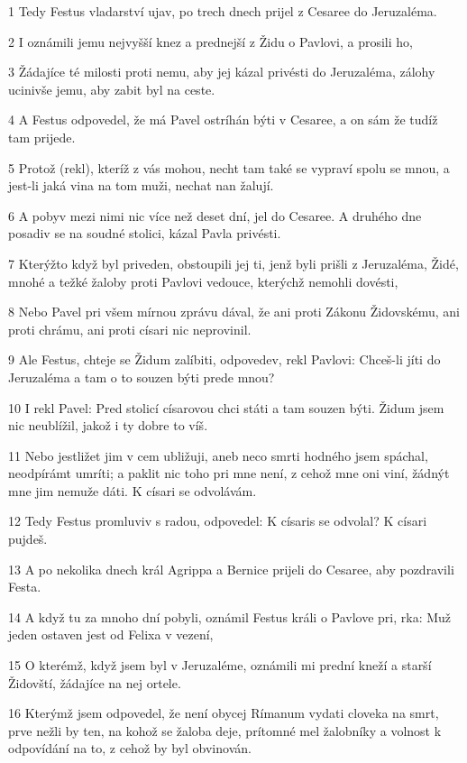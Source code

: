 \par 1 Tedy Festus vladarství ujav, po trech dnech prijel z Cesaree do Jeruzaléma.
\par 2 I oznámili jemu nejvyšší knez a prednejší z Židu o Pavlovi, a prosili ho,
\par 3 Žádajíce té milosti proti nemu, aby jej kázal privésti do Jeruzaléma, zálohy ucinivše jemu, aby zabit byl na ceste.
\par 4 A Festus odpovedel, že má Pavel ostríhán býti v Cesaree, a on sám že tudíž tam prijede.
\par 5 Protož (rekl), kteríž z vás mohou, necht tam také se vypraví spolu se mnou, a jest-li jaká vina na tom muži, nechat nan žalují.
\par 6 A pobyv mezi nimi nic více než deset dní, jel do Cesaree. A druhého dne posadiv se na soudné stolici, kázal Pavla privésti.
\par 7 Kterýžto když byl priveden, obstoupili jej ti, jenž byli prišli z Jeruzaléma, Židé, mnohé a težké žaloby proti Pavlovi vedouce, kterýchž nemohli dovésti,
\par 8 Nebo Pavel pri všem mírnou zprávu dával, že ani proti Zákonu Židovskému, ani proti chrámu, ani proti císari nic neprovinil.
\par 9 Ale Festus, chteje se Židum zalíbiti, odpovedev, rekl Pavlovi: Chceš-li jíti do Jeruzaléma a tam o to souzen býti prede mnou?
\par 10 I rekl Pavel: Pred stolicí císarovou chci státi a tam souzen býti. Židum jsem nic neublížil, jakož i ty dobre to víš.
\par 11 Nebo jestližet jim v cem ubližuji, aneb neco smrti hodného jsem spáchal, neodpírámt umríti; a paklit nic toho pri mne není, z cehož mne oni viní, žádnýt mne jim nemuže dáti. K císari se odvolávám.
\par 12 Tedy Festus promluviv s radou, odpovedel: K císaris se odvolal? K císari pujdeš.
\par 13 A po nekolika dnech král Agrippa a Bernice prijeli do Cesaree, aby pozdravili Festa.
\par 14 A když tu za mnoho dní pobyli, oznámil Festus králi o Pavlove pri, rka: Muž jeden ostaven jest od Felixa v vezení,
\par 15 O kterémž, když jsem byl v Jeruzaléme, oznámili mi prední kneží a starší Židovští, žádajíce na nej ortele.
\par 16 Kterýmž jsem odpovedel, že není obycej Rímanum vydati cloveka na smrt, prve nežli by ten, na kohož se žaloba deje, prítomné mel žalobníky a volnost k odpovídání na to, z cehož by byl obvinován.
